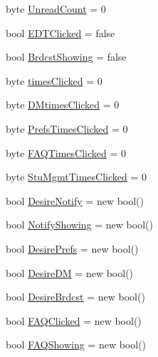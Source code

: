 \begin{DoxyCompactItemize}
\item 
byte \hyperlink{class_sr_p___classroom_inq_1_1frm_classrrom_inq_a9978aff45fb1057f102e224f8485f096}{\-Unread\-Count} = 0
\item 
bool \hyperlink{class_sr_p___classroom_inq_1_1frm_classrrom_inq_a2f126b875f216c20427f6818976a9465}{\-E\-D\-T\-Clicked} = false
\item 
bool \hyperlink{class_sr_p___classroom_inq_1_1frm_classrrom_inq_a03327a44c502ac413d982a79dce5483c}{\-Brdcst\-Showing} = false
\item 
byte \hyperlink{class_sr_p___classroom_inq_1_1frm_classrrom_inq_a8b01f872cc35c75e41502f5114a65b74}{times\-Clicked} = 0
\item 
byte \hyperlink{class_sr_p___classroom_inq_1_1frm_classrrom_inq_a595a5c6942aa919d47de2b3e20f5f5bc}{\-D\-Mtimes\-Clicked} = 0
\item 
byte \hyperlink{class_sr_p___classroom_inq_1_1frm_classrrom_inq_a649306fdbca853561ee4a6cac829315a}{\-Prefs\-Times\-Clicked} = 0
\item 
byte \hyperlink{class_sr_p___classroom_inq_1_1frm_classrrom_inq_a81d1b27ebc720a6da339e1816eab4dfa}{\-F\-A\-Q\-Times\-Clicked} = 0
\item 
byte \hyperlink{class_sr_p___classroom_inq_1_1frm_classrrom_inq_a8746b34d859922daf9b2d5b00cef317e}{\-Stu\-Mgmt\-Times\-Clicked} = 0
\item 
bool \hyperlink{class_sr_p___classroom_inq_1_1frm_classrrom_inq_a39e6b524ac1f9239b638d8c3fe0fca7e}{\-Desire\-Notify} = new bool()
\item 
bool \hyperlink{class_sr_p___classroom_inq_1_1frm_classrrom_inq_a13f540b89ba154a7b133ae266eeb18aa}{\-Notify\-Showing} = new bool()
\item 
bool \hyperlink{class_sr_p___classroom_inq_1_1frm_classrrom_inq_a263bbbace2f9c25e5f92573e5f4845ba}{\-Desire\-Prefs} = new bool()
\item 
bool \hyperlink{class_sr_p___classroom_inq_1_1frm_classrrom_inq_a8f8f9bb905b290fa448b445560458f89}{\-Desire\-D\-M} = new bool()
\item 
bool \hyperlink{class_sr_p___classroom_inq_1_1frm_classrrom_inq_ab67298a2e18c70080e8cc5e604223679}{\-Desire\-Brdcst} = new bool()
\item 
bool \hyperlink{class_sr_p___classroom_inq_1_1frm_classrrom_inq_a2b3fd84c890215dd61c54946b49906d2}{\-F\-A\-Q\-Clicked} = new bool()
\item 
bool \hyperlink{class_sr_p___classroom_inq_1_1frm_classrrom_inq_a37a892198dda5bfa752c66df2debb199}{\-F\-A\-Q\-Showing} = new bool()

\end{DoxyCompactItemize}

